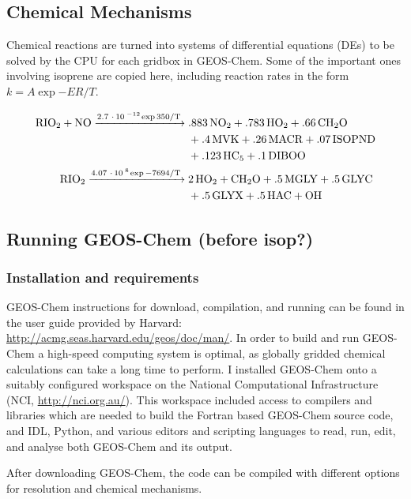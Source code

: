   \subsection{Chemical Mechanisms}
  \label{Model:GC:Mechanisms}
    Chemical reactions are turned into systems of differential equations (DEs) to be solved by the CPU for each gridbox in GEOS-Chem.
    Some of the important ones involving isoprene are copied here, including reaction rates in the form $ k = A \exp{-ER/T} $.
    
    \begin{align} \begin{split}
      \label{Model:GC:Mechanisms:eqn_mechanisms}
      \ce{
        RIO2 + NO ->[2.7*10^{-12} \exp{350/T}] & .883NO2 + .783HO2 + .66CH2O \\
         & + .4MVK + .26MACR + .07ISOPND \\
         & + .123HC5 + .1DIBOO \\
        RIO2 ->[4.07*10^{8} \exp{-7694/T}] & 2HO2 + CH2O + .5MGLY + .5GLYC \\
         & + .5GLYX + .5HAC + OH
      }
%      
    \end{split} \end{align}
  
  \subsection{Running GEOS-Chem (before isop?)}
  \label{Model:GC:running}
    \subsubsection{Installation and requirements}
      GEOS-Chem instructions for download, compilation, and running can be found in the user guide provided by Harvard: \url{http://acmg.seas.harvard.edu/geos/doc/man/}.
      In order to build and run GEOS-Chem a high-speed computing system is optimal, as globally gridded chemical calculations can take a long time to perform.
      I installed GEOS-Chem onto a suitably configured workspace on the National Computational Infrastructure (NCI, \url{http://nci.org.au/}). 
      This workspace included access to compilers and libraries which are needed to build the Fortran based GEOS-Chem source code, and IDL, Python, and various editors and scripting languages to read, run, edit, and analyse both GEOS-Chem and its output.
        
      After downloading GEOS-Chem, the code can be compiled with different options for resolution and chemical mechanisms.

